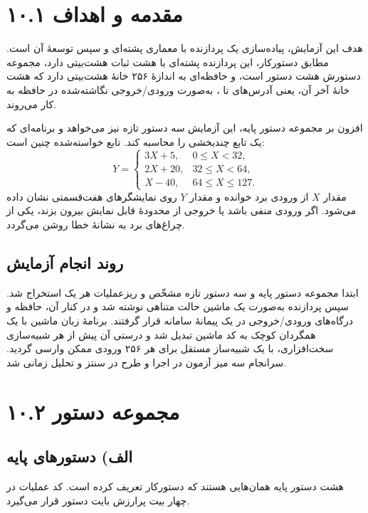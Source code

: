 \documentclass[12pt,a4paper]{article}
\begin{document}

	\section*{۱۰.۱ مقدمه و اهداف}
	هدف این آزمایش، پیاده‌سازی یک پردازنده با معماری پشته‌ای و سپس توسعهٔ آن است. مطابق دستورکار، این پردازنده پشته‌ای با هشت ثبات هشت‌بیتی دارد، مجموعه دستورش هشت دستور است، و حافظه‌ای به اندازهٔ ۲۵۶ خانهٔ هشت‌بیتی دارد که هشت خانهٔ آخر آن، یعنی آدرس‌های  تا ، به‌صورت ورودی/خروجی نگاشته‌شده در حافظه به کار می‌روند.

	افزون بر مجموعه دستور پایه، این آزمایش سه دستور تازه نیز می‌خواهد و برنامه‌ای که یک تابع چندبخشی را محاسبه کند. تابع خواسته‌شده چنین است:
	\[
	Y =
	\begin{cases}
	3X + 5,  & 0 \le X < 32,\\
	2X + 20, & 32 \le X < 64,\\
	X - 40,  & 64 \le X \le 127.
	\end{cases}
	\]
	مقدار \(X\) از ورودی برد خوانده و مقدار \(Y\) روی نمایشگرهای هفت‌قسمتی نشان داده می‌شود. اگر ورودی منفی باشد یا خروجی از محدودهٔ قابل نمایش بیرون بزند، یکی از چراغ‌های برد به نشانهٔ خطا روشن می‌گردد.

	\subsection*{روند انجام آزمایش}
	ابتدا مجموعه دستور پایه و سه دستور تازه مشخّص و ریزعملیات هر یک استخراج شد. سپس پردازنده به‌صورت یک ماشین حالت متناهی نوشته شد و در کنار آن، حافظه و درگاه‌های ورودی/خروجی در یک پیمانهٔ سامانه قرار گرفتند. برنامهٔ زبان ماشین با یک همگردان کوچک به کد ماشین تبدیل شد و درستی آن پیش از هر شبیه‌سازی سخت‌افزاری، با یک شبیه‌ساز مستقل برای هر ۲۵۶ ورودی ممکن وارسی گردید. سرانجام سه میز آزمون در  اجرا و طرح در  سنتز و تحلیل زمانی شد.

	\section*{۱۰.۲ مجموعه دستور}
	\subsection*{الف) دستورهای پایه}
	هشت دستور پایه همان‌هایی هستند که دستورکار تعریف کرده است. کد عملیات در چهار بیت پرارزش بایت دستور قرار می‌گیرد.
\end{document}

